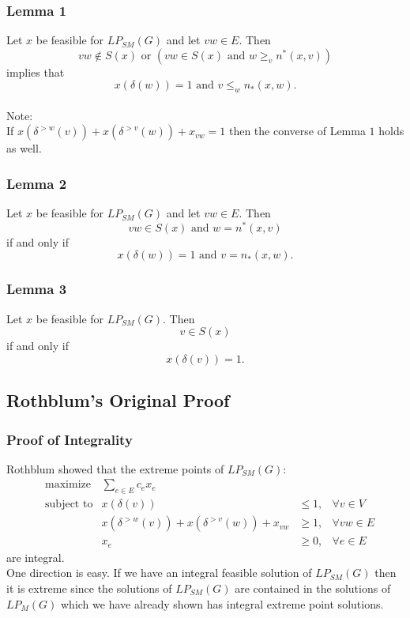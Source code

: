 \documentclass{beamer}
\begin{document}
\begin{frame}
\frametitle{Lemma 1}
Let $x$ be feasible for $LP_{SM}(G)$ and let $vw \in E$. Then $$ vw \not\in S(x) \text{ or } (vw \in S(x) \text{ and } w \geq_v n^*(x,v)) $$ implies that $$ x(\delta(w)) = 1 \text{ and } v \leq_w n_*(x,w). $$\\
Note:\\
If $x(\delta^{>w}(v)) + x(\delta^{>v}(w)) + x_{vw} = 1$ then the converse of Lemma $1$ holds as well.
\end{frame}

\begin{frame}
\frametitle{Lemma 2}
Let $x$ be feasible for $LP_{SM}(G)$ and let $vw \in E$. Then $$vw \in S(x) \text{ and } w = n^*(x,v)$$ if and only if $$x(\delta(w)) = 1 \text{ and } v = n_*(x,w). $$
\end{frame}

\begin{frame}
\frametitle{Lemma 3}
Let $x$ be feasible for $LP_{SM}(G)$. Then $$ v \in S(x) $$ if and only if $$x(\delta(v)) = 1.$$
\end{frame}

\subsection{Rothblum's Original Proof}
\begin{frame}
\frametitle{Proof of Integrality}
Rothblum showed that the extreme points of  $LP_{SM}(G)$:
\begin{align*}
&\text{maximize} &\sum_{e \in E} c_e x_e \\
&\text{subject to} &x(\delta(v)) &\leq 1, &\forall v \in V\\
& &x(\delta^{>w}(v)) + x(\delta^{>v}(w)) + x_{vw} &\geq 1, &\forall vw \in E\\
& &x_e &\geq 0, &\forall e \in E
\end{align*}
are integral.\\
One direction is easy. If we have an integral feasible solution of $LP_{SM}(G)$ then it is extreme since the solutions of $LP_{SM}(G)$ are contained in the solutions of $LP_M(G)$ which we have already shown has integral extreme point solutions.
\end{frame}
\end{document}
